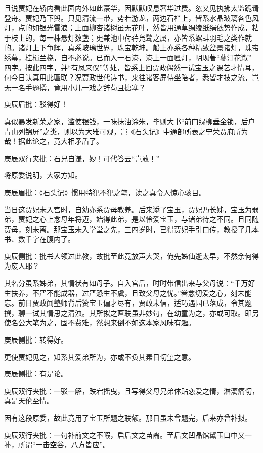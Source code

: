 \begin{parag}
    且说贾妃在轿内看此园内外如此豪华，因默默叹息奢华过费。忽又见执拂太监跪请登舟。贾妃乃下舆。只见清流一带，势若游龙，两边石栏上，皆系水晶玻璃各色风灯，点的如银光雪浪；上面柳杏诸树虽无花叶，然皆用通草绸绫纸绢依势作成，粘于枝上的，每一株悬灯数盏；更兼池中荷荇凫鹭之属，亦皆系螺蚌羽毛之类作就的。诸灯上下争辉，真系玻璃世界，珠宝乾坤。船上亦系各种精致盆景诸灯，珠帘绣幕，桂楫兰桡，自不必说。已而入一石港，港上一面匾灯，明现著“蓼汀花溆” 四字。按此四字，并“有凤来仪”等处，皆系上回贾政偶然一试宝玉之课艺才情耳，何今日认真用此匾联？况贾政世代诗书，来往诸客屏侍坐陪者，悉皆才技之流，岂无一名手题撰，竟用小儿一戏之辞苟且搪塞？\begin{note}庚辰眉批：驳得好！\end{note}真似暴发新荣之家，滥使银钱，一味抹油涂朱，毕则大书“前门绿柳垂金锁，后户青山列锦屏”之类，则以为大雅可观，岂《石头记》中通部所表之宁荣贾府所为哉！据此论之，竟大相矛盾了。\begin{note}庚辰双行夹批：石兄自谦，妙！可代答云“岂敢！”\end{note}将原委说明，大家方知。\begin{note}庚辰眉批：《石头记》惯用特犯不犯之笔，读之真令人惊心骇目。\end{note}
\end{parag}


\begin{parag}
    当日这贾妃未入宫时，自幼亦系贾母教养。后来添了宝玉，贾妃乃长姊，宝玉为弱弟，贾妃之心上念母年将迈，始得此弟，是以怜爱宝玉，与诸弟待之不同。且同随贾母，刻未离。那宝玉未入学堂之先，三四岁时，已得贾妃手引口传，教授了几本书、数千字在腹内了。\begin{note}庚辰侧批：批书人领过此教，故批至此竟放声大哭，俺先姊仙逝太早，不然余何得为废人耶？\end{note}其名分虽系姊弟，其情状有如母子。自入宫后，时时带信出来与父母说：“千万好生扶养，不严不能成器，过严恐生不虞，且致父母之忧。”眷念切爱之心，刻未能忘。前日贾政闻塾师背后赞宝玉偏才尽有，贾政未信，适巧遇园已落成，令其题撰，聊一试其情思之清浊。其所拟之匾联虽非妙句，在幼童为之，亦或可取。即另使名公大笔为之，固不费难，然想来倒不如这本家风味有趣。\begin{note}庚辰侧批：转得好。\end{note}更使贾妃见之，知系其爱弟所为，亦或不负其素日切望之意。\begin{note}庚辰侧批：有是论。\end{note}\begin{note}庚辰双行夹批：一驳一解，跌宕摇曳，且写得父母兄弟体贴恋爱之情，淋漓痛切，真是天伦至情。\end{note}因有这段原委，故此竟用了宝玉所题之联额。那日虽未曾题完，后来亦曾补拟。\begin{note}庚辰双行夹批：一句补前文之不暇，启后文之苗裔。至后文凹晶馆黛玉口中又一补，所谓“一击空谷，八方皆应”。\end{note}
\end{parag}


